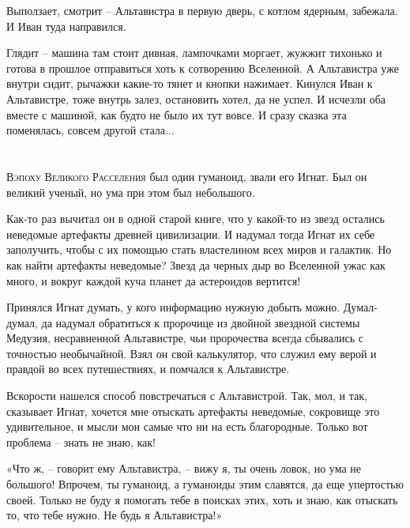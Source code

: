 \documentclass[ebook,oneside,final,openright]{memoir}
\begin{document}
\par
Выползает, смотрит – Альтавистра в первую дверь, с котлом ядерным, забежала. И Иван туда направился.\par
\par
Глядит – машина там стоит дивная, лампочками моргает, жужжит тихонько и готова в прошлое отправиться хоть к сотворению Вселенной. А Альтавистра уже внутри сидит, рычажки какие-то тянет и кнопки нажимает. Кинулся Иван к Альтавистре, тоже внутрь залез, остановить хотел, да не успел. И исчезли оба вместе с машиной, как будто не было их тут вовсе. И сразу сказка эта поменялась, совсем другой стала...\par

\chapter{}
 \lettrine{В}{эпоху Великого Расселения} был один гуманоид, звали его Игнат. Был он великий ученый, но ума при этом был небольшого.\par
\par
Как-то раз вычитал он в одной старой книге, что у какой-то из звезд остались неведомые артефакты древней цивилизации. И надумал тогда Игнат их себе заполучить, чтобы с их помощью стать властелином всех миров и галактик. Но как найти артефакты неведомые? Звезд да черных дыр во Вселенной ужас как много, и вокруг каждой куча планет да астероидов вертится!\par
\par
Принялся Игнат думать, у кого информацию нужную добыть можно. Думал-думал, да надумал обратиться к пророчице из двойной звездной системы Медузия, несравненной Альтавистре, чьи пророчества всегда сбывались с точностью необычайной. Взял он свой калькулятор, что служил ему верой и правдой во всех путешествиях, и помчался к Альтавистре.\par
\par
Вскорости нашелся способ повстречаться с Альтавистрой. Так, мол, и так, сказывает Игнат, хочется мне отыскать артефакты неведомые, сокровище это удивительное, и мысли мои самые что ни на есть благородные. Только вот проблема – знать не знаю, как!\par
\par
«Что ж, – говорит ему Альтавистра, – вижу я, ты очень ловок, но ума не большого! Впрочем, ты гуманоид, а гуманоиды этим славятся, да еще упертостью своей. Только не буду я помогать тебе в поисках этих, хоть и знаю, как отыскать то, что тебе нужно. Не будь я Альтавистра!» \par
\end{document}
